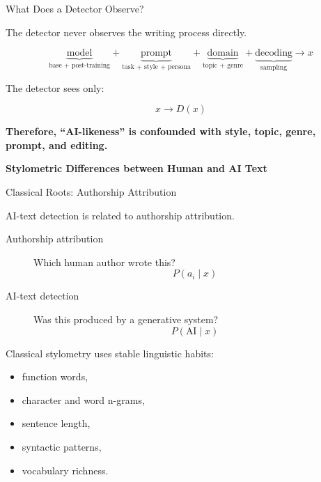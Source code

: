 \documentclass[11pt,compress,t,notes=noshow, xcolor=table]{beamer}
\begin{document}
\begin{vbframe}{What Does a Detector Observe?}

The detector never observes the writing process directly.

\[
\underbrace{\text{model}}_{\text{base + post-training}}
+\underbrace{\text{prompt}}_{\text{task + style + persona}}
+\underbrace{\text{domain}}_{\text{topic + genre}}
+\underbrace{\text{decoding}}_{\text{sampling}}
\longrightarrow x
\]

The detector sees only:

\[
x \longrightarrow D(x)
\]

\begin{center}
\textbf{Therefore, ``AI-likeness'' is confounded with style, topic, genre, prompt, and editing.}
\end{center}

\end{vbframe}


\begin{frame}[plain]
\vfill
\begin{center}
{\LARGE \textbf{Stylometric Differences between Human and AI Text}}
\end{center}
\vfill
\end{frame}

\begin{vbframe}{Classical Roots: Authorship Attribution}

AI-text detection is related to authorship attribution.

\begin{description}
    \item[Authorship attribution]
    Which human author wrote this?
    \[
    P(a_i\mid x)
    \]

    \item[AI-text detection]
    Was this produced by a generative system?
    \[
    P(\text{AI}\mid x)
    \]
\end{description}

Classical stylometry uses stable linguistic habits:

\begin{itemize}
    \item function words,
    \item character and word n-grams,
    \item sentence length,
    \item syntactic patterns,
    \item vocabulary richness.
\end{itemize}


\end{vbframe}
\end{document}
